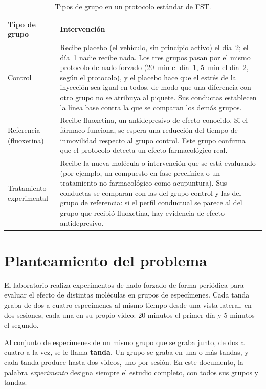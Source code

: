 \begin{table}[H]
\centering
\caption{Tipos de grupo en un protocolo estándar de FST.}
\label{tab:grupos_experimentales}
\small
\begin{tabular}{|p{3.2cm}|p{10.5cm}|}
\hline
\textbf{Tipo de grupo} & \textbf{Intervención} \\
\hline
Control
  & Recibe placebo (el vehículo, sin principio activo) el día~2; el día~1 nadie recibe
    nada. Los tres grupos pasan por el mismo protocolo de nado forzado (20~min el día~1,
    5~min el día~2, según el protocolo), y el placebo hace que el estrés de la inyección sea igual en todos,
    de modo que una diferencia con otro grupo no se atribuya al piquete. Sus conductas
    establecen la línea base contra la que se comparan los demás grupos. \\
\hline
Referencia (fluoxetina)
  & Recibe fluoxetina, un antidepresivo de efecto conocido. Si el fármaco funciona, se
    espera una reducción del tiempo de inmovilidad respecto al grupo control. Este grupo
    confirma que el protocolo detecta un efecto farmacológico real. \\
\hline
Tratamiento experimental
  & Recibe la nueva molécula o intervención que se está evaluando (por ejemplo, un
    compuesto en fase preclínica o un tratamiento no farmacológico como acupuntura).
    Sus conductas se comparan con las del grupo control y las del grupo de referencia:
    si el perfil conductual se parece al del grupo que recibió fluoxetina, hay evidencia
    de efecto antidepresivo. \\
\hline
\end{tabular}
\end{table}

\section{Planteamiento del problema}

El laboratorio realiza experimentos de nado forzado de forma periódica para evaluar el
efecto de distintas moléculas en grupos de especímenes. Cada tanda graba de dos a
cuatro especímenes al mismo tiempo desde una vista lateral, en dos sesiones, cada una en su propio video: 20 minutos el primer día y
5 minutos el segundo.

Al conjunto de especímenes de un mismo grupo que se graba junto, de dos a cuatro a la vez,
se le llama \textbf{tanda}. Un grupo se graba en una o más tandas, y cada tanda produce
hasta dos videos, uno por sesión. En este documento, la palabra \textit{experimento}
designa siempre el estudio completo, con todos sus grupos y tandas.

